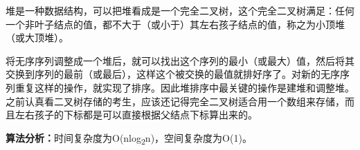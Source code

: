 {堆是一种数据结构，{可以把堆看成是一个完全二叉树}，这个完全二叉树满足：{任何一个非叶子结点的值，都不大于（或小于）其左右孩子结点的值，称之为小顶堆（或大顶堆）。}}

{将无序序列调整成一个堆后，就可以找出这个序列的最小（或最大）值，然后将其交换到序列的最前（或最后），这样这个被交换的最值就排好序了。对新的无序序列重复这样的操作，就实现了排序。因此堆排序中最关键的操作是建堆和调整堆。之前认真看二叉树存储的考生，应该还记得完全二叉树适合用一个数组来存储，而且左右孩子的下标都是可以直接根据父结点下标算出来的。}

{\textbf{}}{\textbf{算法分析：}时间复杂度为}{O(nlog\textsubscript{2}n)}{，空间复杂度为}{O(1)}{。}{\\
}

